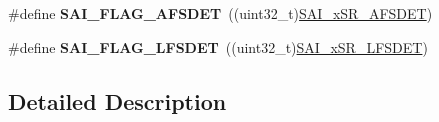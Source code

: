\begin{DoxyCompactItemize}
\item 
\#define {\bfseries S\+A\+I\+\_\+\+F\+L\+A\+G\+\_\+\+A\+F\+S\+D\+ET}~((uint32\+\_\+t)\hyperlink{group___peripheral___registers___bits___definition_ga5acc2e10428061bed46dc98ae7aa7f31}{S\+A\+I\+\_\+x\+S\+R\+\_\+\+A\+F\+S\+D\+ET})\hypertarget{group___s_a_i___block___flags___definition_gaffb2ac751ef50c606e81c1b7053dc9f8}{}\label{group___s_a_i___block___flags___definition_gaffb2ac751ef50c606e81c1b7053dc9f8}

\item 
\#define {\bfseries S\+A\+I\+\_\+\+F\+L\+A\+G\+\_\+\+L\+F\+S\+D\+ET}~((uint32\+\_\+t)\hyperlink{group___peripheral___registers___bits___definition_gaa2d45adbe2be27461e25ecbf736e0500}{S\+A\+I\+\_\+x\+S\+R\+\_\+\+L\+F\+S\+D\+ET})\hypertarget{group___s_a_i___block___flags___definition_ga14530e721c4c0a3310237b42ae631cd6}{}\label{group___s_a_i___block___flags___definition_ga14530e721c4c0a3310237b42ae631cd6}

\end{DoxyCompactItemize}


\subsection{Detailed Description}
